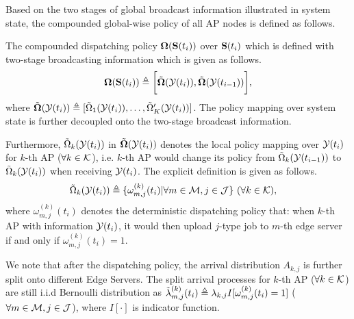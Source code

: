 Based on the two stages of global broadcast information illustrated in system state, the compounded global-wise policy of all AP nodes is defined as follows.
\begin{definition}
    The compounded dispatching policy $\boldsymbol{\Omega}(\mathbf{S}(t_{i}))$ over $\mathbf{S}(t_{i})$ which is defined with two-stage broadcasting information which is given as follows.
    \begin{align}
        \boldsymbol{\Omega}(\mathbf{S}(t_{i})) \triangleq \bigg[
            \tilde{\boldsymbol{\Omega}}(\mathcal{Y}(t_{i})), \tilde{\boldsymbol{\Omega}}(\mathcal{Y}(t_{i-1}))
        \bigg],
    \end{align}
    where
    $\tilde{\boldsymbol{\Omega}}(\mathcal{Y}(t_{i})) \triangleq [\tilde{\Omega}_{1}(\mathcal{Y}(t_{i})), \dots, \tilde{\Omega}'_{K}(\mathcal{Y}(t_{i}))]$.
    The policy mapping over system state is further decoupled onto the two-stage broadcast information.

    Furthermore,
    $\tilde{\Omega}_{k}(\mathcal{Y}(t_{i}))$ in $\tilde{\boldsymbol{\Omega}}(\mathcal{Y}(t_{i}))$
    denotes the local policy mapping over $\mathcal{Y}(t_{i})$ for $k$-th AP ($\forall k\in\mathcal{K}$), i.e. $k$-th AP would change its policy from $\tilde{\Omega}_{k}(\mathcal{Y}(t_{i-1}))$ to $\tilde{\Omega}_{k}(\mathcal{Y}(t_{i}))$ when receiving $\mathcal{Y}(t_{i})$.
    The explicit definition is given as follows.
    \begin{align}
        &\tilde{\Omega}_{k}(\mathcal{Y}(t_{i})) \triangleq \{\omega^{(k)}_{m,j}(t_{i})|\forall m\in\mathcal{M}, j\in\mathcal{J}\}
        ~(\forall k\in\mathcal{K}),
        \label{def_action}
    \end{align}
    where $\omega^{(k)}_{m,j}(t_{i})$ denotes the deterministic dispatching policy that: when $k$-th AP with information $\mathcal{Y}(t_{i})$, it would then upload $j$-type job to $m$-th edge server if and only if $\omega^{(k)}_{m,j}(t_{i})=1$.
\end{definition}

We note that after the dispatching policy, the arrival distribution $A_{k,j}$ is further split onto different Edge Servers. The split arrival processes for $k$-th AP ($\forall k\in\mathcal{K}$) are still i.i.d Bernoulli distribution as
$\tilde{\lambda}^{(k)}_{m,j}(t_{i}) \triangleq \lambda_{k,j} I[\omega^{(k)}_{m,j}(t_i) = 1]$ ($\forall m\in\mathcal{M}, j\in\mathcal{J}$), where $I[\cdot]$ is indicator function.


